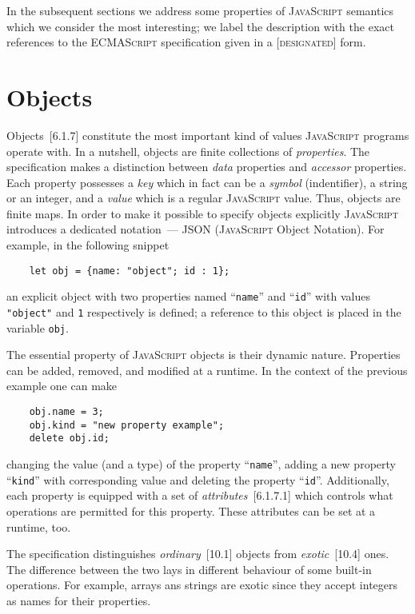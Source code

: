 \documentclass{article}
\newcommand{\js}{\textsc{JavaScript}\xspace}
\newcommand{\es}{\textsc{ECMAScript}\xspace}
\newcommand{\rf}[1]{[\textsc{#1}]}
\begin{document}
In the subsequent sections we address some properties of \js semantics which we consider the most interesting; we
label the description with the exact references to the \es specification given in a \rf{designated} form.

\section{Objects}
\label{sec:model}

Objects~\rf{6.1.7} constitute the most important kind of values \js programs operate with. In a nutshell, objects are
finite collections of \emph{properties}. The specification makes a distinction between \emph{data} properties and \emph{accessor}
properties. Each property possesses a \emph{key} which in fact can be a \emph{symbol}
(indentifier), a string or an integer, and a \emph{value} which is a regular \js value. Thus, objects are finite maps.
In order to make it possible to specify objects explicitly \js introduces a dedicated notation~--- JSON (\js Object Notation).
For example, in the following snippet

\begin{lstlisting}
    let obj = {name: "object"; id : 1};
\end{lstlisting}

an explicit object with two properties named ``\lstinline|name|'' and ``\lstinline|id|'' with values \lstinline|"object"| and
\lstinline|1| respectively is defined; a reference to this object is placed in the variable \lstinline|obj|.

The essential property of \js objects is their dynamic nature. Properties can be added, removed, and modified at a runtime.
In the context of the previous example one can make

\begin{lstlisting}
    obj.name = 3;
    obj.kind = "new property example";
    delete obj.id;
\end{lstlisting}

changing the value (and a type) of the property ``\lstinline|name|'', adding a new property ``\lstinline|kind|'' with
corresponding value and deleting the property ``\lstinline|id|''. Additionally, each property is equipped with a set
of \emph{attributes}~\rf{6.1.7.1} which controls what operations are permitted for this property. These attributes can
be set at a runtime, too. 

The specification distinguishes \emph{ordinary}~\rf{10.1} objects from \emph{exotic}~\rf{10.4} ones. The difference between the
two lays in different behaviour of some built-in operations. For example, arrays ans strings are exotic since they
accept integers as names for their properties.
\end{document}
